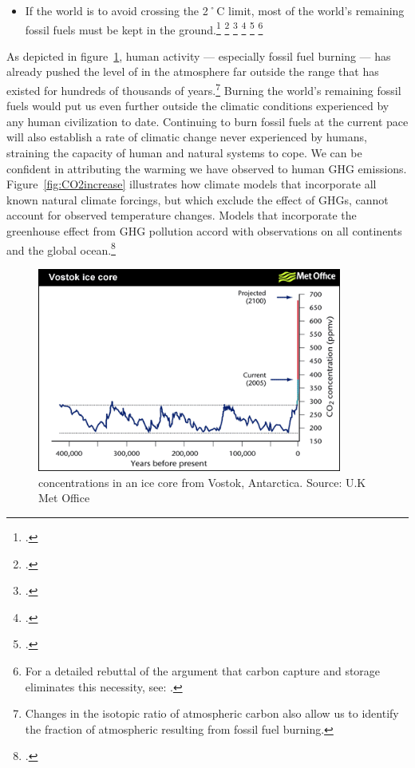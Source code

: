 \documentclass[10pt]{article}
\begin{document}
\begin{itemize}
	\item If the world is to avoid crossing the 2˚C limit, most of the world's remaining fossil fuels must be kept in the ground.\footcite[][]{IEA2012} \footcite[][]{EconomistUnburnable} \footcite[][]{TerrifyingNewMath} \footcite[The Australian government's Climate Commission states that most fossil fuels must be left in the ground and cannot be burned ][p. 5]{CriticalDecade2013} \footcite[][]{ChallengeTwoDegrees} \footnote{For a detailed rebuttal of the argument that carbon capture and storage eliminates this necessity, see: .}
\end{itemize}


As depicted in figure~\ref{fig:Vostok}, human activity --- especially fossil fuel burning --- has already pushed the level of  in the atmosphere  far outside the range that has existed for hundreds of thousands of years.\footnote{Changes in the isotopic ratio of atmospheric carbon also allow us to identify the fraction of atmospheric  resulting from fossil fuel burning.}
Burning the world's remaining fossil fuels would put us even further outside the climatic conditions experienced by any human civilization to date.
Continuing to burn fossil fuels at the current pace will also establish a rate of climatic change never experienced by humans, straining the capacity of human and natural systems to cope.
We can be confident in attributing the warming we have observed to human GHG emissions.
Figure~\ref{fig:CO2increase} illustrates how climate models that incorporate all known natural climate forcings, but which exclude the effect of GHGs, cannot account for observed temperature changes. 
Models that incorporate the greenhouse effect from GHG pollution accord with observations on all continents and the global ocean.\footcite[][]{IPCC2007}



\begin{figure}
\includegraphics[width=100mm]{s2-co2increase.png}
\centering
\caption{ concentrations in an ice core from Vostok, Antarctica. Source: U.K Met Office}
\label{fig:Vostok}
\end{figure}
\end{document}

